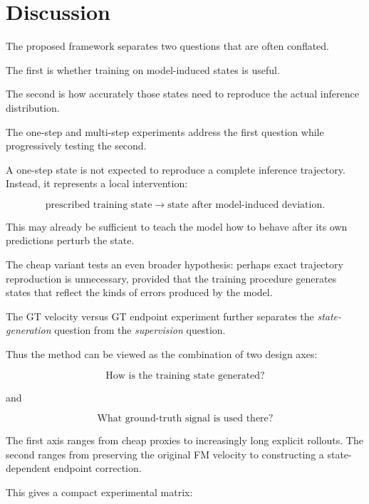 \documentclass[11pt]{article}
\begin{document}
\section{Discussion}

The proposed framework separates two questions that are often conflated.

The first is whether training on model-induced states is useful.

The second is how accurately those states need to reproduce the actual
inference distribution.

The one-step and multi-step experiments address the first question while
progressively testing the second.

A one-step state is not expected to reproduce a complete inference trajectory.
Instead, it represents a local intervention:

\begin{equation}
\text{prescribed training state}
\rightarrow
\text{state after model-induced deviation}.
\end{equation}

This may already be sufficient to teach the model how to behave after its own
predictions perturb the state.

The cheap variant tests an even broader hypothesis: perhaps exact trajectory
reproduction is unnecessary, provided that the training procedure generates
states that reflect the kinds of errors produced by the model.

The GT velocity versus GT endpoint experiment further separates the
\emph{state-generation} question from the \emph{supervision} question.

Thus the method can be viewed as the combination of two design axes:

\begin{equation}
\boxed{
\text{How is the training state generated?}
}
\end{equation}

and

\begin{equation}
\boxed{
\text{What ground-truth signal is used there?}
}
\end{equation}

The first axis ranges from cheap proxies to increasingly long explicit
rollouts. The second ranges from preserving the original FM velocity to
constructing a state-dependent endpoint correction.

This gives a compact experimental matrix:
\end{document}
